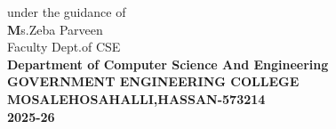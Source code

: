 \documentclass[12pt,a4paper]{report}
\begin{document}
\begin{titlepage}
under the guidance of \\
\textbf Ms.Zeba Parveen\\
Faculty Dept.of CSE\\
\vspace{1cm}
\textbf{\Large{Department of Computer Science And Engineering}}\\
\vspace{0.2cm}
\textbf{\Large{GOVERNMENT ENGINEERING COLLEGE}}\\
\vspace{0.2cm}
\textbf{\Large{MOSALEHOSAHALLI,HASSAN-573214}}\\
\vspace{0.2cm}
\textbf{\Large{2025-26}}\\
\end{titlepage}
\end{document}
